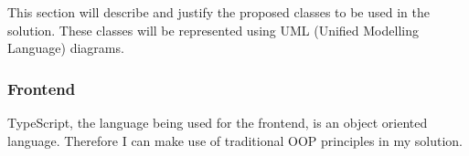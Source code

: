 \documentclass[../../main.tex]{subfiles}
\begin{document}
\noindent This section will describe and justify the proposed classes to be used in the solution.
These classes will be represented using UML (Unified Modelling Language) diagrams.


\subsubsection{Frontend}

\noindent TypeScript, the language being used for the frontend,
is an object oriented language. Therefore I can make use of
traditional OOP principles in my solution.

\begin{comment}
TODO: finish and add? 010524

These are:

\begin{enumerate}
    \item \textbf{Abstraction}\\
          The process of hiding data that is not directly relevant.
          A function that operates on a class should not have to be
          concerned with the inner workings of the class, instead
          that detail is abstracted away into public functions exposed
          by the class.
    \item \textbf{Encapsulation}\\
          A process of placing data and supplemental functions
          that perform operations on the data in the same object.
          Complexities of the object's implementation such as private
          variables are abstracted away and the object only exposes public
          functions to get, set, or modify the data.

    \item \textbf{Inheritance}
\end{enumerate}
\end{comment}
\end{document}
